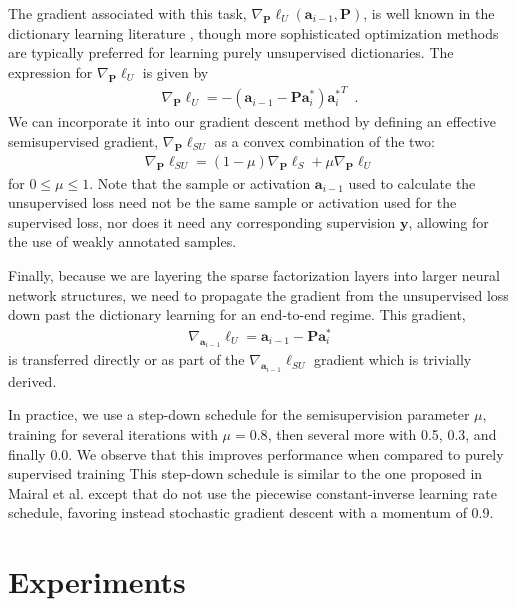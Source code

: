 \documentclass[10pt,twocolumn,letterpaper]{article}
\renewcommand{\vec}{\mathbf}
\newcommand{\grad}[2]{\nabla_{\!\! #1} #2}
\newcommand{\loss}{\ensuremath{\ell}}
\newcommand{\y}{\vec{y}}
\renewcommand{\P}{\vec{P}}
\renewcommand{\a}{\vec{a}}
\begin{document}
The gradient associated with this task, $\nabla_\P\loss_U(\a_{i-1},\P)$, is well known in the dictionary learning literature \cite{ElBOOK2010}, though more sophisticated optimization methods are typically preferred for learning purely unsupervised dictionaries. The expression for $\nabla_\P\loss_U$ is given by
\begin{align}
    \grad{\P}{\loss_U} = -(\a_{i-1}-\P\a_i^*){\a_i^*}^T
\enspace.
\label{eq:grad_U}
\end{align}
We can incorporate it into our gradient descent method by defining an effective semisupervised gradient, $\nabla_\P\loss_{SU}$ as a convex combination of the two:
\begin{align}
    \grad{\P}{\loss_{SU}} = (1-\mu)\nabla_\P\loss_S + \mu\nabla_\P\loss_U
\label{eq:loss_SU}
\end{align}
for $0\le\mu\le1$. Note that the sample or activation $\a_{i-1}$ used to calculate the unsupervised loss need not be the same sample or activation used for the supervised loss, nor does it need any corresponding supervision $\y$, allowing for the use of weakly annotated samples.

Finally, because we are layering the sparse factorization layers into larger neural network structures, we need to propagate the gradient from the unsupervised loss down past the dictionary learning for an end-to-end regime.  This gradient,
\begin{align}
    \grad{\a_{i-1}}{\loss_{U}} = \a_{i-1}-\P\a_i^* 
\end{align}
is transferred directly or as part of the $\nabla_{\a_{i-1}}\loss_{SU}$ gradient which is trivially derived.


In practice, we use a step-down schedule for the semisupervision parameter $\mu$, training for several iterations with $\mu=0.8$, then several more with 0.5, 0.3, and finally 0.0. We observe that this improves performance when compared to purely supervised training
This step-down schedule is similar to the one proposed in Mairal et al. \cite{MaBaPoTPAMI2012} except that do not use the piecewise constant-inverse learning rate schedule, favoring instead stochastic gradient descent with a momentum of 0.9.





\section{Experiments}
\label{sec:experiments}
\end{document}

